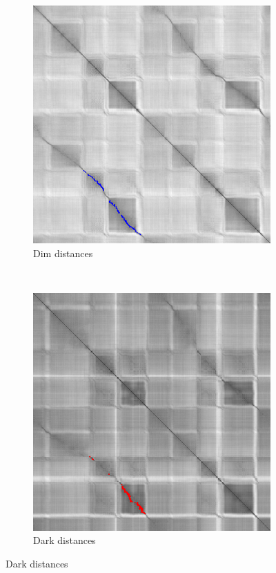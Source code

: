 \documentclass[]{spie}  %
\begin{document}
\begin{figure}[!htb]
\begin{subfigure}[b]{0.27\textwidth}
        \includegraphics[trim = 0mm 0mm 0mm 0mm, clip, width=\textwidth]{figures/dist_dim.png}    
        \caption{Dim distances}
        \label{subfig:dist_dim}
        \end{subfigure}
         ~ 
        \begin{subfigure}[b]{0.27\textwidth}
        \centering
        \includegraphics[trim = 0mm 0mm 0mm 0mm, clip, width=\textwidth]{figures/dist_dark.png}    
        \caption{Dark distances}
        \label{subfig:dist_dark}
        \end{subfigure}
        

\end{figure}
\end{document}
